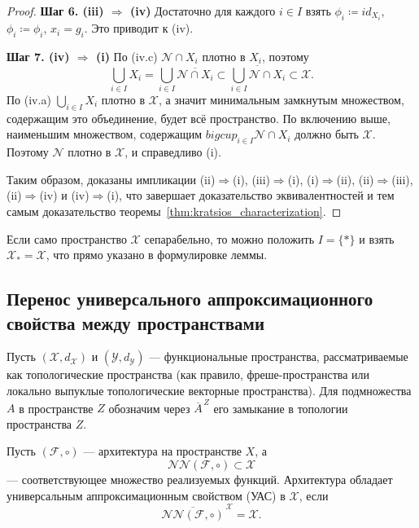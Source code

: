 \documentclass[../NDCNNAI_main.tex]{subfiles}
\begin{document}
\begin{proof}
\noindent\textbf{Шаг 6. (iii) $\Rightarrow$ (iv)}
Достаточно для каждого $i \in I$ взять $\phi_i \coloneq id_{X_i}$, $\phi_i \coloneq \phi_i$, $x_i = g_i$. Это приводит к (iv).

\noindent\textbf{Шаг 7. (iv) $\Rightarrow$ (i)}
По (iv.c) $\mathcal{N} \cap X_i$ плотно в $X_i$, поэтому 
\[
\bigcup_{i \in I} X_i = \bigcup_{i \in I} \overline{\mathcal{N} \cap X_i} \subset \overline{\bigcup_{i \in I} \mathcal{N} \cap X_i} \subset \mathcal{X}.
\]
По (iv.a) $\bigcup_{i \in I} X_i$ плотно в $\mathcal{X}$, а значит минимальным замкнутым множеством, содержащим это объединение, будет всё пространство.
По включению выше, наименьшим множеством, содержащим $bigcup_{i \in I} \mathcal{N} \cap X_i$ должно быть $\mathcal{X}$.
Поэтому $\mathcal{N}$ плотно в $\mathcal{X}$, и справедливо (i).

Таким образом, доказаны импликации (ii)$\Rightarrow$(i), (iii)$\Rightarrow$(i),
(i)$\Rightarrow$(ii), (ii)$\Rightarrow$(iii), (ii)$\Rightarrow$(iv) и (iv)$\Rightarrow$(i), что завершает доказательство эквивалентностей
и тем самым доказательство теоремы~\ref{thm:kratsios_characterization}.
\end{proof}
\begin{remark}
  Если само пространство $\mathcal{X}$ сепарабельно, то можно положить $I=\{\ast\}$ и взять $\mathcal{X}_\ast=\mathcal{X}$,
  что прямо указано в формулировке леммы.
\end{remark}

\subsection{Перенос универсального аппроксимационного свойства между пространствами}
Пусть $(\mathcal{X},d_\mathcal{X})$ и $(\mathcal{Y},d_\mathcal{Y})$ --- функциональные пространства, рассматриваемые как
топологические пространства (как правило, фреше-пространства или локально
выпуклые топологические векторные пространства).
Для подмножества $A$ в пространстве $Z$ обозначим через $\overline{A}^{\,Z}$
его замыкание в топологии пространства $Z$.

Пусть $(\mathcal{F},\circ)$ --- архитектура на пространстве $X$, а
\[
\mathcal{NN}(\mathcal{F},\circ)\subset \mathcal{X}
\]
--- соответствующее множество реализуемых функций.
Архитектура обладает универсальным аппроксимационным свойством (УАС) в $\mathcal{X}$, если
\[
\overline{\mathcal{NN}(\mathcal{F},\circ)}^{\,\mathcal{X}}=\mathcal{X}.
\]
\end{document}
